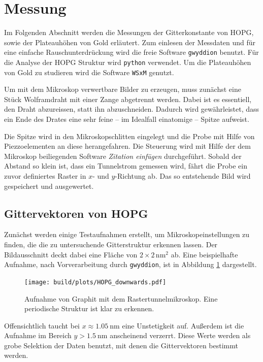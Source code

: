 \section{Messung} %
\label{sec:messung}
Im Folgenden Abschnitt werden die Messungen der Gitterkonstante von HOPG, sowie
der Plateauhöhen von Gold erläutert. Zum einlesen der Messdaten und für eine
einfache Rauschunterdrückung wird die freie Software \texttt{gwyddion}
\cite{gwyddion} benutzt. Für die Analyse der HOPG Struktur wird \texttt{python}
\cite{python3} verwendet.
Um die Plateauhöhen von Gold zu studieren wird die Software \texttt{WSxM} \cite{WSxM} genutzt.

Um mit dem Mikroskop verwertbare Bilder zu erzeugen, muss zunächst eine Stück
Wolframdraht mit einer Zange abgetrennt werden. Dabei ist es essentiell, den
Draht abzureissen, statt ihn abzuschneiden. Dadurch wird gewährleistet, dass
ein Ende des Drates eine sehr feine -- im Idealfall einatomige -- Spitze
aufweist.

Die Spitze wird in den Mikroskopschlitten eingelegt und die Probe mit Hilfe von
Piezzoelementen an diese herangefahren. Die Steuerung wird mit Hilfe der dem
Mikroskop beiliegenden Software \emph{Zitation einfügen} durchgeführt.
Sobald der Abstand so klein ist, dass ein Tunnelstrom gemessen wird, fährt
die Probe ein zuvor definiertes Raster in $x$- und $y$-Richtung ab. Das so
entstehende Bild wird gespeichert und ausgewertet.

\subsection{Gittervektoren von HOPG}
\label{subsec:gitter}
Zunächst werden einige Testaufnahmen erstellt, um Mikroskopeinstellungen zu
finden, die die zu untersuchende Gitterstruktur erkennen lassen.
Der Bildausschnitt deckt dabei eine Fläche von $\num{2}\times\num{2}\,
\si{\nano\meter\squared}$ ab. Eine beispielhafte Aufnahme, nach Vorverarbeitung
durch \texttt{gwyddion}, ist in Abbildung \ref{fig:hopg1} dargestellt.
\begin{figure}
    \centering
    \texttt{[image: build/plots/HOPG\_downwards.pdf]}
    \caption{Aufnahme von Graphit mit dem Rastertunnelmikroskop. Eine
             periodische Struktur ist klar zu erkennen.}
    \label{fig:hopg1}
\end{figure}
Offensichtlich taucht bei $x \approx \SI{1.05}{\nano\meter}$ eine Unstetigkeit
auf. Außerdem ist die Aufnahme im Bereich $y > \SI{1.5}{\nano\meter}$
anscheinend verzerrt. Diese Werte werden als grobe Selektion der Daten
benutzt, mit denen die Gittervektoren bestimmt werden.

